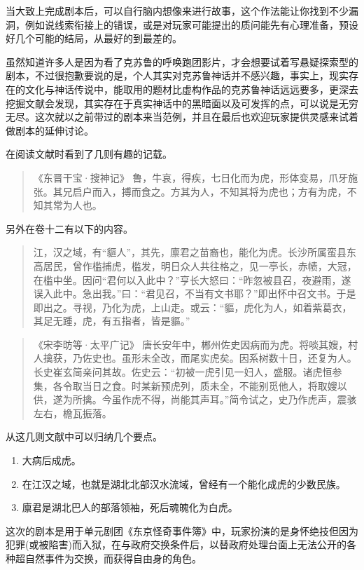 \documentclass[a4paper,zihao=-4,notitlepage,twoside,openright]{ctexart}
\begin{document}
当大致上完成剧本后，可以自行脑内想像来进行故事，这个作法能让你找到不少漏洞，例如说线索衔接上的错误，或是对玩家可能提出的质问能先有心理准备，预设好几个可能的结局，从最好的到最差的。

虽然知道许多人是因为看了克苏鲁的呼唤跑团影片，才会想要试着写悬疑探索型的剧本，不过很抱歉要说的是，个人其实对克苏鲁神话并不感兴趣，事实上，现实存在的文化与神话传说中，能取用的题材比虚构作品的克苏鲁神话远远要多，更深去挖掘文献会发现，其实存在于真实神话中的黑暗面以及可发挥的点，可以说是无穷无尽。这次就以之前带过的剧本来当范例，并且在最后也欢迎玩家提供灵感来试着做剧本的延伸讨论。

在阅读文献时看到了几则有趣的记载。

\begin{quote}
《东晋干宝·搜神记》
鲁，牛哀，得疾，七日化而为虎，形体变易，爪牙施张。其兄启户而入，搏而食之。方其为人，不知其将为虎也；方有为虎，不知其常为人也。
\end{quote}

另外在卷十二有以下的内容。

\begin{quote}
江，汉之域，有“貙人”，其先，廪君之苗裔也，能化为虎。长沙所属蛮县东高居民，曾作槛捕虎，槛发，明日众人共往格之，见一亭长，赤帻，大冠，在槛中坐。因问“君何以入此中？”亨长大怒曰：“昨忽被县召，夜避雨，遂误入此中。急出我。”曰：“君见召，不当有文书耶？”即出怀中召文书。于是即出之。寻视，乃化为虎，上山走。或云：“貙，虎化为人，如着紫葛衣，其足无踵，虎，有五指者，皆是貙。”
\end{quote}

\begin{quote}
《宋李昉等·太平广记》
唐长安年中，郴州佐史因病而为虎。将啖其嫂，村人擒获，乃佐史也。虽形未全改，而尾实虎矣。因系树数十日，还复为人。长史崔玄简亲问其故。佐史云：“初被一虎引见一妇人，盛服。诸虎恒参集，各令取当日之食。时某新预虎列，质未全，不能别觅他人，将取嫂以供，遂为所擒。今虽作虎不得，尚能其声耳。”简令试之，史乃作虎声，震骇左右，檐瓦振落。
\end{quote}

从这几则文献中可以归纳几个要点。

\begin{enumerate}
\item 大病后成虎。
\item 在江汉之域，也就是湖北北部汉水流域，曾经有一个能化成虎的少数民族。
\item 廪君是湖北巴人的部落领袖，死后魂魄化为白虎。
\end{enumerate}

这次的剧本是用于单元剧团《东京怪奇事件簿》中，玩家扮演的是身怀绝技但因为犯罪(或被陷害)而入狱，在与政府交换条件后，以替政府处理台面上无法公开的各种超自然事件为交换，而获得自由身的角色。
\end{document}

